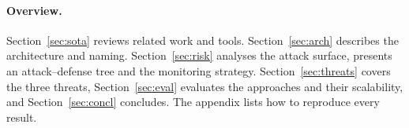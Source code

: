 \paragraph{Overview.}
Section~\ref{sec:sota} reviews related work and tools. Section~\ref{sec:arch} describes the
architecture and naming. Section~\ref{sec:risk} analyses the attack surface, presents an
attack--defense tree and the monitoring strategy. Section~\ref{sec:threats} covers the three
threats, Section~\ref{sec:eval} evaluates the approaches and their scalability, and
Section~\ref{sec:concl} concludes. The appendix lists how to reproduce every result.

